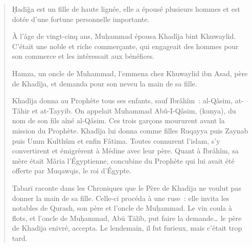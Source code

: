 \begin{quotation}
    
Ḫadīğa est un fille de haute lignée, elle a épousé plusieurs hommes et
est dotée d'une fortune personnelle importante.

À l'âge de vingt-cinq ans, Muḥammad épousa Khadîja bint Khuwaylid.
C'était une noble et riche commerçante, qui engageait des hommes pour
son commerce et les intéressait aux bénéfices.

Hamza, un oncle de Muhammad, l'emmena chez Khuwaylid ibn Asad, père de
Khadîja, et demanda pour son neveu la main de sa fille.

Khadîja donna au Prophète tous ses enfants, sauf Ibrâhîm~: al-Qâsim,
at-Tâhir et at-Tayyib. On appelait Muhammad Abû-I-Qâsim, (kunya), du nom
de son fils aîné al-Qâsim. Ces trois garçons moururent avant la mission
du Prophète. Khadîja lui donna comme filles Ruqayya puis Zaynab puis Umm
Kulthûm et enfin Fâtima. Toutes connurent l'islam, s'y convertirent et
émigrèrent à Médine avec leur père. Quant à Ibrâhîm, sa mère était Mâria
l'Égyptienne, concubine du Prophète qui lui avait été offerte par
Muqawqis, le roi d'Égypte.

Tabarī raconte dans les Chroniques que le Père de Khadija ne voulut pas
donner la main de sa fille. Celle-ci procéda à une ruse~: elle invita
les notables de Qurash, son père et l'oncle de Muḥammad. Le vin coula à
flots, et l'oncle de Muḥammad, Abū Tālib, put faire la demande\ldots{}
le père de Khadija enivré, accepta. Le lendemain, il fut furieux, mais
c'était trop tard.
\end{quotation}


